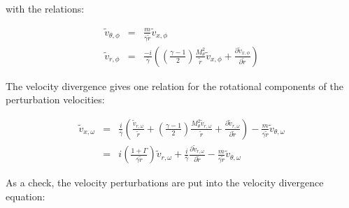 \documentclass[12pt]{article}
\begin{document}
with the relations:

\begin{eqnarray}
\widetilde{v}_{\theta,\phi}
&=&
\frac{m}{\overline{\gamma} \widetilde{r}} \widetilde{v}_{x,\phi}
\nonumber
\\
\widetilde{v}_{r,\phi}
&=&
\frac{-i}{ \overline{\gamma}}
\left(
\left(\frac{\gamma-1}{2} \right)
\frac{M_{\theta}^2}{\widetilde{r}}
\widetilde{v}_{x,\phi}
+
\frac{\partial \widetilde{v}_{x,\phi}}{\partial \widetilde{r}} 
\right)
\nonumber
\end{eqnarray}

The velocity divergence gives one relation for the rotational
components of the perturbation velocities:

\begin{eqnarray}
\widetilde{v}_{x,\omega}
&=&
\frac{i}{\overline{\gamma}}
\left(
\frac{ \widetilde{v}_{r,\omega}}{\widetilde{r}}
+
\left(
\frac{\gamma-1}{2}
\right)
\frac{
M_{\theta}^2
 \widetilde{v}_{r,\omega}
}{\widetilde{r}}
+ \frac{\partial \widetilde{v}_{r,\omega}}{\partial \widetilde{r}}
\right)
- \frac{m}{\overline{\gamma} \widetilde{r}} \widetilde{v}_{\theta,\omega}
\nonumber
\\
&=&
i
\left(
\frac{ 1 + \Gamma}{\overline{\gamma} \widetilde{r}}
\right)
 \widetilde{v}_{r,\omega}
+ 
\frac{i}{\overline{\gamma}}
\frac{\partial \widetilde{v}_{r,\omega}}{\partial \widetilde{r}}
- \frac{m}{\overline{\gamma} \widetilde{r}} \widetilde{v}_{\theta,\omega}
\nonumber
\end{eqnarray}

As a check, the velocity perturbations
are put into the velocity divergence equation:
\end{document}
